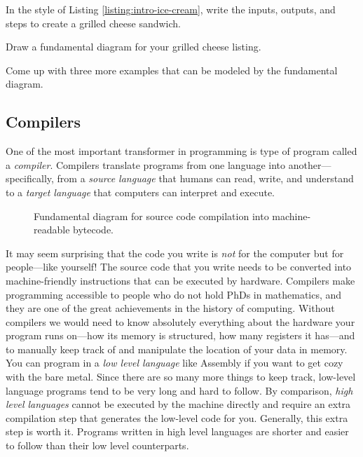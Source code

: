 \begin{question}
  In the style of Listing \ref{listing:intro-ice-cream}, write the inputs, outputs, and steps to create a grilled cheese sandwich.
\end{question}

\begin{question}
  Draw a fundamental diagram for your grilled cheese listing.
\end{question}

\begin{question}
  Come up with three more examples that can be modeled by the fundamental diagram.
\end{question}


\subsection{Compilers} One of the most important transformer in programming is type of program called a \emph{compiler}. Compilers translate programs from one language into another---specifically, from a \emph{source language} that humans can read, write, and understand to a \emph{target language} that computers can interpret and execute.

\begin{figure}[h]
  
  \caption{\label{fig:intro-example-compiler} Fundamental diagram for source code compilation into machine-readable bytecode.}
\end{figure}

It may seem surprising that the code you write is \emph{not} for the computer but for people---like yourself! The source code that you write needs to be converted into machine-friendly instructions that can be executed by hardware. Compilers make programming accessible to people who do not hold PhDs in mathematics, and they are one of the great achievements in the history of computing. Without compilers we would need to know absolutely everything about the hardware your program runs on---how its memory is structured, how many registers it has---and to manually keep track of and manipulate the location of your data in memory. You can program in a \emph{low level language} like Assembly if you want to get cozy with the bare metal. Since there are so many more things to keep track, low-level language programs tend to be very long and hard to follow. By comparison, \emph{high level languages} cannot be executed by the machine directly and require an extra compilation step that generates the low-level code for you. Generally, this extra step is worth it. Programs written in high level languages are shorter and easier to follow than their low level counterparts.

